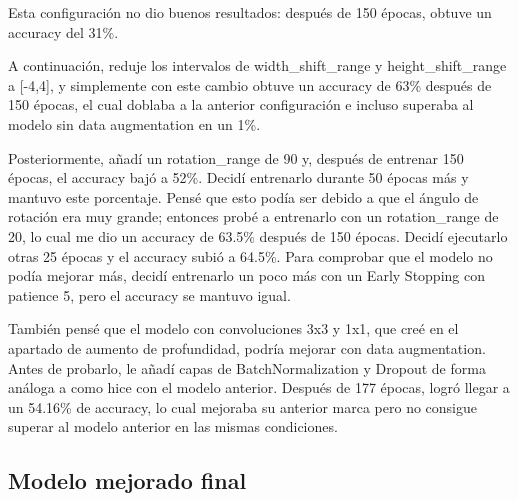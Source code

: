 \documentclass[10pt,a4paper]{article}
\begin{document}
Esta configuración no dio buenos resultados: después de 150 épocas, obtuve un accuracy del 31\%.

A continuación, reduje los intervalos de width\_shift\_range y height\_shift\_range a [-4,4], y simplemente con este cambio obtuve un accuracy de 63\% después de 150 épocas, el cual doblaba a la anterior configuración e incluso superaba al modelo sin data augmentation en un 1\%.

Posteriormente, añadí un rotation\_range de 90 y, después de entrenar 150 épocas, el accuracy bajó a 52\%. Decidí entrenarlo durante 50 épocas más y mantuvo este porcentaje. Pensé que esto podía ser debido a que el ángulo de rotación era muy grande; entonces probé a entrenarlo con un rotation\_range de 20, lo cual me dio un accuracy de 63.5\% después de 150 épocas. Decidí ejecutarlo otras 25 épocas y el accuracy subió a 64.5\%. Para comprobar que el modelo no podía mejorar más, decidí entrenarlo un poco más con un Early Stopping con patience 5, pero el accuracy se mantuvo igual.

También pensé que el modelo con convoluciones 3x3 y 1x1, que creé en el apartado de aumento de profundidad, podría mejorar con data augmentation. Antes de probarlo, le añadí capas de BatchNormalization y Dropout de forma análoga a como hice con el modelo anterior. Después de 177 épocas, logró llegar a un 54.16\% de accuracy, lo cual mejoraba su anterior marca pero no consigue superar al modelo anterior en las mismas condiciones.



\subsection{Modelo mejorado final}
\end{document}
